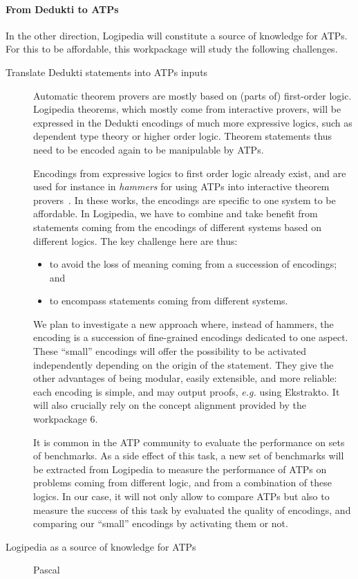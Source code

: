 \paragraph{From {\sf Dedukti} to ATPs}
\label{concept:wp4:deduktitoatp}

In the other direction, {\sf Logipedia} will constitute a source of
knowledge for ATPs. For this to be affordable, this workpackage will
study the following challenges.

\begin{description}
\item[Translate {\sf Dedukti} statements into ATPs inputs] Automatic
  theorem provers are mostly based on (parts of) first-order logic. {\sf
    Logipedia} theorems, which mostly come from interactive provers,
  will be expressed in the {\sf Dedukti} encodings of much more
  expressive logics, such as dependent type theory or higher order
  logic. Theorem statements thus need to be encoded again to be
  manipulable by ATPs.

  Encodings from expressive logics to first order logic already exist,
  and are used for instance in {\em hammers} for using ATPs into
  interactive theorem
  provers~\cite{DBLP:conf/lpar/PaulsonB10,DBLP:journals/jar/CzajkaK18}.
  In these works, the encodings are specific to one system to be
  affordable. In {\sf Logipedia}, we have to combine and take benefit
  from statements coming from the encodings of different systems based
  on different logics. The key challenge here are thus:
  \begin{itemize}
  \item to avoid the loss of meaning coming from a succession of
    encodings; and
  \item to encompass statements coming from different systems.
  \end{itemize}
  We plan to investigate a new approach where, instead of hammers, the
  encoding is a succession of fine-grained encodings dedicated to one
  aspect. These ``small'' encodings will offer the possibility to be
  activated independently depending on the origin of the statement. They
  give the other advantages of being modular, easily extensible, and
  more reliable: each encoding is simple, and may output proofs, {\em
    e.g.} using Ekstrakto. It will also crucially rely on the concept
  alignment provided by the workpackage 6.

  It is common in the ATP community to evaluate the performance on
  sets of benchmarks. As a side effect of this task, a new set of
  benchmarks will be extracted from {\sf Logipedia} to measure the
  performance of ATPs on problems coming from different logic, and from
  a combination of these logics. In our case, it will not only allow to
  compare ATPs but also to measure the success of this task by evaluated
  the quality of encodings, and comparing our ``small'' encodings by
  activating them or not.

\item[{\sf Logipedia} as a source of knowledge for ATPs] Pascal
\end{description}



